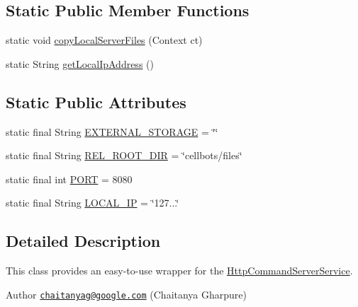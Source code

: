 \subsection*{Static Public Member Functions}
\begin{DoxyCompactItemize}
\item 
static void \hyperlink{classcom_1_1cellbots_1_1httpserver_1_1_http_command_server_service_manager_a8f29ffc9b5c6a964838b70ba74bcaad2}{copy\-Local\-Server\-Files} (Context ct)
\item 
static String \hyperlink{classcom_1_1cellbots_1_1httpserver_1_1_http_command_server_service_manager_ac39f0fbae9cac14e86bd877277c49702}{get\-Local\-Ip\-Address} ()
\end{DoxyCompactItemize}
\subsection*{Static Public Attributes}
\begin{DoxyCompactItemize}
\item 
static final String \hyperlink{classcom_1_1cellbots_1_1httpserver_1_1_http_command_server_service_manager_a3a652cb537b216c0017809da08947eaf}{E\-X\-T\-E\-R\-N\-A\-L\-\_\-\-S\-T\-O\-R\-A\-G\-E} = \char`\"{}\char`\"{}
\item 
static final String \hyperlink{classcom_1_1cellbots_1_1httpserver_1_1_http_command_server_service_manager_a83a6e0d5243779bce31bb6b1b74c6356}{R\-E\-L\-\_\-\-R\-O\-O\-T\-\_\-\-D\-I\-R} = \char`\"{}cellbots/files\char`\"{}
\item 
static final int \hyperlink{classcom_1_1cellbots_1_1httpserver_1_1_http_command_server_service_manager_a8c9c780120e49febbb7090e4e967a23a}{P\-O\-R\-T} = 8080
\item 
static final String \hyperlink{classcom_1_1cellbots_1_1httpserver_1_1_http_command_server_service_manager_a99a75b81829498e33b59d6be766acdbb}{L\-O\-C\-A\-L\-\_\-\-I\-P} = \char`\"{}127...\char`\"{}
\end{DoxyCompactItemize}


\subsection{Detailed Description}
This class provides an easy-\/to-\/use wrapper for the \hyperlink{classcom_1_1cellbots_1_1httpserver_1_1_http_command_server_service}{Http\-Command\-Server\-Service}.

\begin{DoxyAuthor}{Author}
\href{mailto:chaitanyag@google.com}{\tt chaitanyag@google.\-com} (Chaitanya Gharpure) 
\end{DoxyAuthor}


